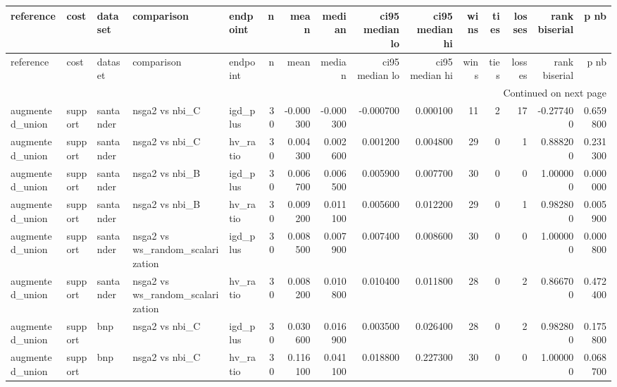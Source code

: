 \begin{landscape}
\begin{center}\label{tab:s13eff}\end{center}
\begingroup\tiny\setlength{\tabcolsep}{2.5pt}
\begin{longtable}{lllllrrrrrrrrrr}
\toprule
reference & cost & dataset & comparison & endpoint & n & mean & median & ci95 median lo & ci95 median hi & wins & ties & losses & rank biserial & p nb \\
\midrule
\endfirsthead
\toprule
reference & cost & dataset & comparison & endpoint & n & mean & median & ci95 median lo & ci95 median hi & wins & ties & losses & rank biserial & p nb \\
\midrule
\endhead
\midrule
\multicolumn{15}{r}{Continued on next page} \\
\midrule
\endfoot
\bottomrule
\endlastfoot
augmented\_union & support & santander & nsga2 vs nbi\_C & igd\_plus & 30 & -0.000300 & -0.000300 & -0.000700 & 0.000100 & 11 & 2 & 17 & -0.277400 & 0.659800 \\
augmented\_union & support & santander & nsga2 vs nbi\_C & hv\_ratio & 30 & 0.004300 & 0.002600 & 0.001200 & 0.004800 & 29 & 0 & 1 & 0.888200 & 0.231300 \\
augmented\_union & support & santander & nsga2 vs nbi\_B & igd\_plus & 30 & 0.006700 & 0.006500 & 0.005900 & 0.007700 & 30 & 0 & 0 & 1.000000 & 0.000000 \\
augmented\_union & support & santander & nsga2 vs nbi\_B & hv\_ratio & 30 & 0.009200 & 0.011100 & 0.005600 & 0.012200 & 29 & 0 & 1 & 0.982800 & 0.005900 \\
augmented\_union & support & santander & nsga2 vs ws\_random\_scalarization & igd\_plus & 30 & 0.008500 & 0.007900 & 0.007400 & 0.008600 & 30 & 0 & 0 & 1.000000 & 0.000800 \\
augmented\_union & support & santander & nsga2 vs ws\_random\_scalarization & hv\_ratio & 30 & 0.008200 & 0.010800 & 0.010400 & 0.011800 & 28 & 0 & 2 & 0.866700 & 0.472400 \\
augmented\_union & support & bnp & nsga2 vs nbi\_C & igd\_plus & 30 & 0.030600 & 0.016900 & 0.003500 & 0.026400 & 28 & 0 & 2 & 0.982800 & 0.175800 \\
augmented\_union & support & bnp & nsga2 vs nbi\_C & hv\_ratio & 30 & 0.116100 & 0.041100 & 0.018800 & 0.227300 & 30 & 0 & 0 & 1.000000 & 0.068700 \\

\end{longtable}
\end{landscape}

